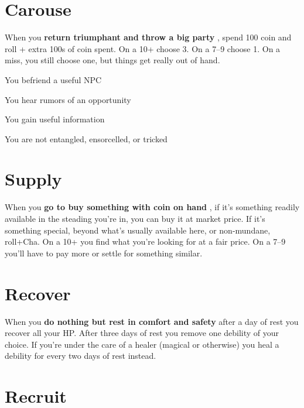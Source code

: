        
\section{Carouse}   
       

When you {\bf return triumphant and throw a big party} , spend 100 coin and roll + extra 100s of coin spent. On a 10+ choose 3. On a 7–9 choose 1. On a miss, you still choose one, but things get really out of hand.

       
\startitemize[1,packed]
         
\item You befriend a useful NPC

         
\item You hear rumors of an opportunity

         
\item You gain useful information

         
\item You are not entangled, ensorcelled, or tricked

       
\stopitemize
       
\section{Supply}   
       

When you {\bf go to buy something with coin on hand} , if it's something readily available in the steading you're in, you can buy it at market price. If it's something special, beyond what's usually available here, or non-mundane, roll+Cha. On a 10+ you find what you're looking for at a fair price. On a 7–9 you'll have to pay more or settle for something similar.

       
\section{Recover}   
       

When you {\bf do nothing but rest in comfort and safety}  after a day of rest you recover all your HP. After three days of rest you remove one debility of your choice. If you're under the care of a healer (magical or otherwise) you heal a debility for every two days of rest instead.

       
\section{Recruit}   
       

